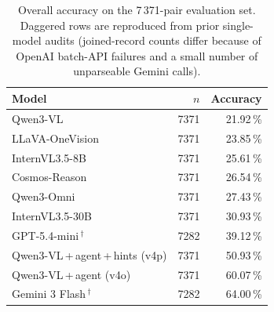 \documentclass[11pt,a4paper]{article}
\newcommand{\pct}[1]{#1\,\%}
\begin{document}
\begin{table}[h]
\centering
\begin{tabular}{lrr}
\toprule
Model & $n$ & Accuracy \\
\midrule
Qwen3-VL                         & 7371 & \pct{21.92} \\
LLaVA-OneVision                  & 7371 & \pct{23.85} \\
InternVL3.5-8B                   & 7371 & \pct{25.61} \\
Cosmos-Reason                    & 7371 & \pct{26.54} \\
Qwen3-Omni                     & 7371 & \pct{27.43} \\
InternVL3.5-30B                  & 7371 & \pct{30.93} \\
GPT-5.4-mini\,$^\dagger$         & 7282 & \pct{39.12} \\
Qwen3-VL\,+\,agent\,+\,hints (v4p) & 7371 & \pct{50.93} \\
Qwen3-VL\,+\,agent (v4o)         & 7371 & \pct{60.07} \\
Gemini 3 Flash\,$^\dagger$       & 7282 & \pct{64.00} \\
\bottomrule
\end{tabular}
\caption{Overall accuracy on the 7\,371-pair evaluation set. Daggered
rows are reproduced from prior single-model audits (joined-record
counts differ because of OpenAI batch-API failures and a small number
of unparseable Gemini calls).}
\label{tab:overall}
\end{table}
\end{document}
